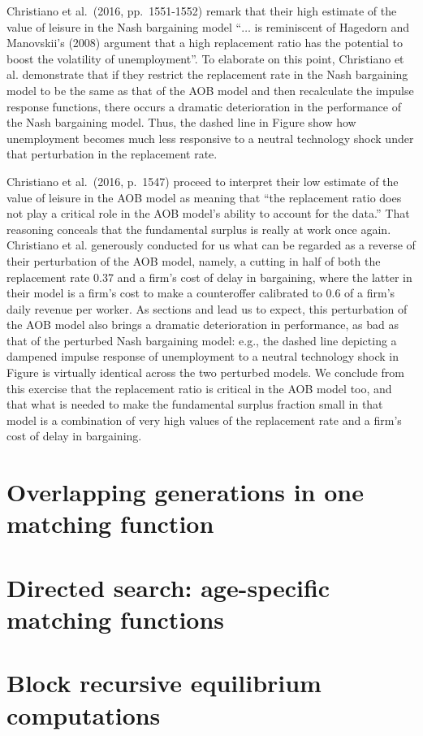  Christiano et al.\ (2016, pp.~1551-1552) remark that 
   their high estimate of the value of leisure in the
Nash bargaining model ``$\ldots$  is reminiscent of Hagedorn
and Manovskii's (2008) argument that a high replacement ratio has
the potential to boost the volatility of unemployment''.
To elaborate on this point, Christiano et al. demonstrate  that if they restrict the replacement
rate in the Nash bargaining model to be the same as that of the
AOB model and then recalculate the impulse response functions, there occurs
a dramatic deterioration in the performance of the Nash
bargaining model. Thus,  the dashed line in Figure 
show how  unemployment becomes much less responsive to
a neutral technology shock under that perturbation in the replacement rate.

Christiano et al.\ (2016, p.~1547) proceed to interpret  their low estimate of the value of leisure in the
AOB model as meaning that ``the replacement ratio does not play a critical role
in the AOB model's ability to account for the data.''
That  reasoning conceals that the fundamental surplus  is really at work once again. Christiano et al.
 generously conducted for us  what can be regarded as a reverse of their perturbation of the AOB model, namely, a cutting in half
of both the replacement rate 0.37 and a firm's cost of delay
in bargaining, where the latter in their model is a firm's
cost to make a counteroffer  calibrated to 0.6 of a firm's
daily revenue per worker.
As  sections
 and  lead us to expect, this
perturbation of the AOB model also brings a dramatic
deterioration in performance, as bad as that of the perturbed Nash
bargaining model: e.g., the dashed line depicting a
dampened impulse response of unemployment to a neutral
technology shock in Figure  
is virtually identical across the two perturbed models.
We conclude from this exercise that the replacement ratio is  critical
in the AOB model too, and that  what is needed to make the fundamental surplus fraction small
in that model
is a combination of very high
values of the replacement rate and a firm's cost of delay in
bargaining.




\section{Overlapping generations in one matching function}


\section{Directed search: age-specific matching functions}


\section{Block recursive equilibrium computations}


